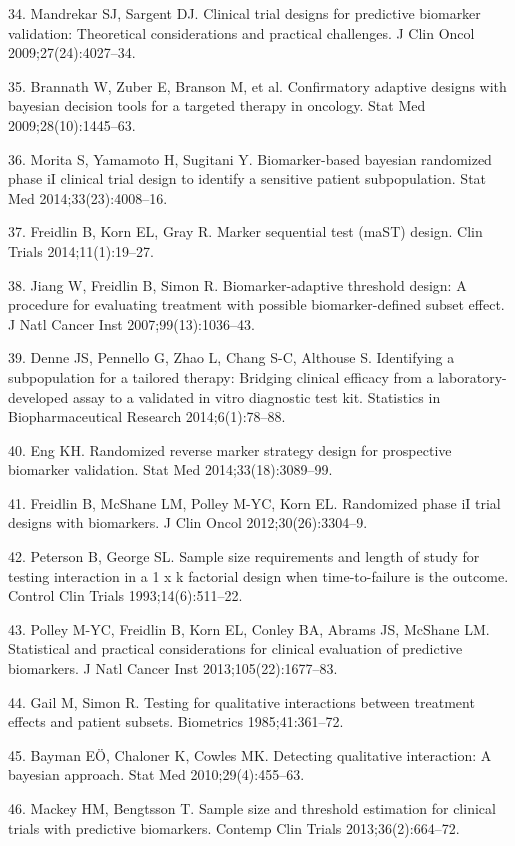 \documentclass[11pt]{article}
\begin{document}
34. Mandrekar SJ, Sargent DJ. Clinical trial designs for predictive
biomarker validation: Theoretical considerations and practical
challenges. J Clin Oncol 2009;27(24):4027--34.

35. Brannath W, Zuber E, Branson M, et al. Confirmatory adaptive designs
with bayesian decision tools for a targeted therapy in oncology. Stat
Med 2009;28(10):1445--63.

36. Morita S, Yamamoto H, Sugitani Y. Biomarker-based bayesian
randomized phase iI clinical trial design to identify a sensitive
patient subpopulation. Stat Med 2014;33(23):4008--16.

37. Freidlin B, Korn EL, Gray R. Marker sequential test (maST) design.
Clin Trials 2014;11(1):19--27.

38. Jiang W, Freidlin B, Simon R. Biomarker-adaptive threshold design: A
procedure for evaluating treatment with possible biomarker-defined
subset effect. J Natl Cancer Inst 2007;99(13):1036--43.

39. Denne JS, Pennello G, Zhao L, Chang S-C, Althouse S. Identifying a
subpopulation for a tailored therapy: Bridging clinical efficacy from a
laboratory-developed assay to a validated in vitro diagnostic test kit.
Statistics in Biopharmaceutical Research 2014;6(1):78--88.

40. Eng KH. Randomized reverse marker strategy design for prospective
biomarker validation. Stat Med 2014;33(18):3089--99.

41. Freidlin B, McShane LM, Polley M-YC, Korn EL. Randomized phase iI
trial designs with biomarkers. J Clin Oncol 2012;30(26):3304--9.

42. Peterson B, George SL. Sample size requirements and length of study
for testing interaction in a 1 x k factorial design when time-to-failure
is the outcome. Control Clin Trials 1993;14(6):511--22.

43. Polley M-YC, Freidlin B, Korn EL, Conley BA, Abrams JS, McShane LM.
Statistical and practical considerations for clinical evaluation of
predictive biomarkers. J Natl Cancer Inst 2013;105(22):1677--83.

44. Gail M, Simon R. Testing for qualitative interactions between
treatment effects and patient subsets. Biometrics 1985;41:361--72.

45. Bayman EÖ, Chaloner K, Cowles MK. Detecting qualitative interaction:
A bayesian approach. Stat Med 2010;29(4):455--63.

46. Mackey HM, Bengtsson T. Sample size and threshold estimation for
clinical trials with predictive biomarkers. Contemp Clin Trials
2013;36(2):664--72.
\end{document}
